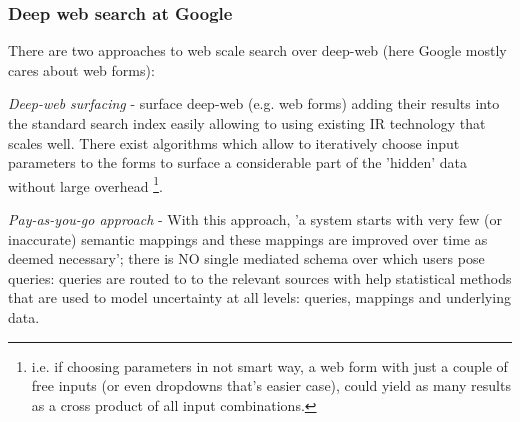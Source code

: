 {\color{gray}
\subsubsection*{Deep web search at Google}

There are two approaches to web scale search over deep-web (here Google mostly cares about web forms):  

\textit{Deep-web surfacing} - surface deep-web (e.g. web forms) adding their results into the standard search index  easily allowing to using existing IR technology that scales well. There exist algorithms which allow to iteratively choose input parameters to the forms to surface a considerable part of the 'hidden' data without large overhead%
	\footnote{i.e. if choosing parameters in not smart way, a web form with just a couple of free inputs (or even dropdowns that's easier case), could yield as many results as a cross product of all input combinations.}.

\textit{Pay-as-you-go approach}\cite{webscale_paygo} - With this approach, 'a system starts with
very few (or inaccurate) semantic mappings and these mappings are improved over time as deemed necessary';
there is NO single mediated schema over which users pose queries: queries are routed to to the relevant sources with help statistical methods that are used to model uncertainty at all levels: queries, mappings and underlying data. 
}

